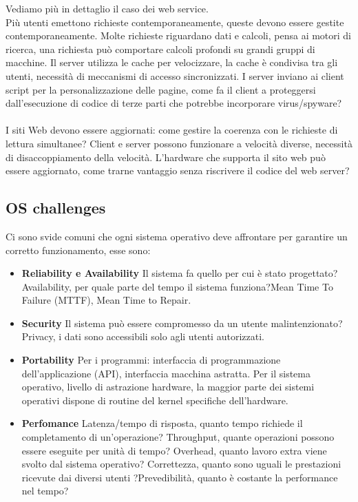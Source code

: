 \begin{example}
    Vediamo più in dettaglio il caso dei web service. \\
    Più utenti emettono richieste contemporaneamente, queste devono essere gestite contemporaneamente. 
    Molte richieste riguardano dati e calcoli, pensa ai motori di ricerca, una richiesta può comportare calcoli profondi su grandi gruppi di macchine. 
    Il server utilizza le cache per velocizzare, la cache è condivisa tra gli utenti, necessità di meccanismi di accesso sincronizzati. 
    I server inviano ai client script per la personalizzazione delle pagine, come fa il client a proteggersi dall'esecuzione di codice di terze parti che potrebbe incorporare virus/spyware?\\\\
    I siti Web devono essere aggiornati: come gestire la coerenza con le richieste di lettura simultanee? Client e server possono funzionare a velocità diverse, 
    necessità di disaccoppiamento della velocità. 
    L'hardware che supporta il sito web può essere aggiornato, come trarne vantaggio senza riscrivere il codice del web server?
\end{example}

\subsection{OS challenges}
Ci sono svide comuni che ogni sistema operativo deve affrontare per garantire un corretto funzionamento, esse sono:
\begin{itemize}
    \item \textbf{Reliability e Availability} Il sistema fa quello per cui è stato progettato? Availability, per quale parte del tempo il sistema funziona?Mean Time To Failure (MTTF), Mean Time to Repair.
    \item \textbf{Security} Il sistema può essere compromesso da un utente malintenzionato?Privacy, i dati sono accessibili solo agli utenti autorizzati.
    \item \textbf{Portability} Per i programmi: interfaccia di programmazione dell'applicazione (API), interfaccia macchina astratta. Per il sistema operativo, livello di astrazione hardware, la maggior parte dei sistemi operativi dispone di routine del kernel specifiche dell'hardware.
    \item \textbf{Perfomance} Latenza/tempo di risposta, quanto tempo richiede il completamento di un'operazione? Throughput, quante operazioni possono essere eseguite per unità di tempo? Overhead, quanto lavoro extra viene svolto dal sistema operativo? Correttezza, quanto sono uguali le prestazioni ricevute dai diversi utenti ?Prevedibilità, quanto è costante la performance nel tempo?
\end{itemize}

